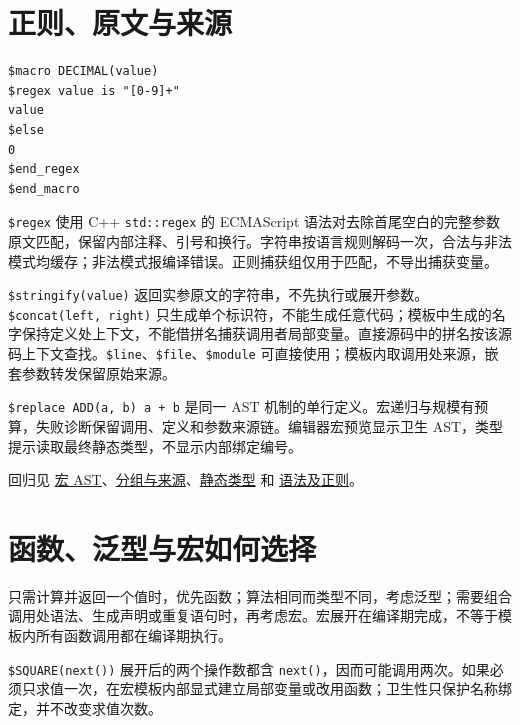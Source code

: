 \section{正则、原文与来源}

\par
\medskip
\begin{lstlisting}[style=chali]
$macro DECIMAL(value)
$regex value is "[0-9]+"
value
$else
0
$end_regex
$end_macro
\end{lstlisting}
\par
\medskip

\texttt{\$regex} 使用 C++ \texttt{std:\allowbreak{}:\allowbreak{}regex} 的 ECMAScript 语法对去除首尾空白的完整参数原文匹配，保留内部注释、引号和换行。字符串按语言规则解码一次，合法与非法模式均缓存；非法模式报编译错误。正则捕获组仅用于匹配，不导出捕获变量。

\texttt{\$stringify(\allowbreak{}value)\allowbreak{}} 返回实参原文的字符串，不先执行或展开参数。\texttt{\$concat(\allowbreak{}left,\allowbreak{} right)\allowbreak{}} 只生成单个标识符，不能生成任意代码；模板中生成的名字保持定义处上下文，不能借拼名捕获调用者局部变量。直接源码中的拼名按该源码上下文查找。\texttt{\$line}、\texttt{\$file}、\texttt{\$module} 可直接使用；模板内取调用处来源，嵌套参数转发保留原始来源。

\texttt{\$replace ADD(\allowbreak{}a,\allowbreak{} b)\allowbreak{} a + b} 是同一 AST 机制的单行定义。宏递归与规模有预算，失败诊断保留调用、定义和参数来源链。编辑器宏预览显示卫生 AST，类型提示读取最终静态类型，不显示内部绑定编号。

回归见 \href{https://gitee.com/rabbitc999/chali/blob/master/tests/chali_ast_macros.py}{宏 AST}、\href{https://gitee.com/rabbitc999/chali/blob/master/tests/chali_macro_groups.py}{分组与来源}、\href{https://gitee.com/rabbitc999/chali/blob/master/tests/chali_macro_generics.py}{静态类型} 和 \href{https://gitee.com/rabbitc999/chali/blob/master/tests/chali_macro_branches.py}{语法及正则}。

\section{函数、泛型与宏如何选择}

只需计算并返回一个值时，优先函数；算法相同而类型不同，考虑泛型；需要组合调用处语法、生成声明或重复语句时，再考虑宏。宏展开在编译期完成，不等于模板内所有函数调用都在编译期执行。

\texttt{\$SQUARE(\allowbreak{}next(\allowbreak{})\allowbreak{})\allowbreak{}} 展开后的两个操作数都含 \texttt{next(\allowbreak{})\allowbreak{}}，因而可能调用两次。如果必须只求值一次，在宏模板内部显式建立局部变量或改用函数；卫生性只保护名称绑定，并不改变求值次数。

